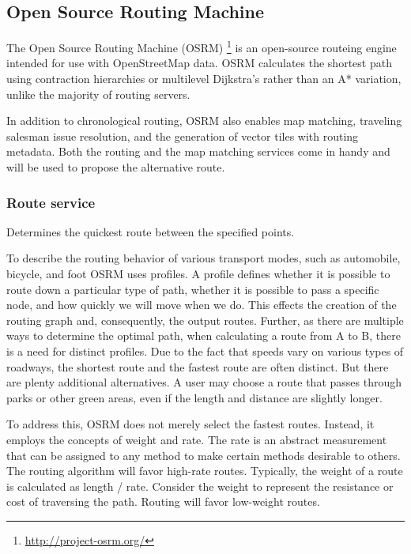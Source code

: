  




\subsection{Open Source Routing Machine}

The Open Source Routing Machine (OSRM) \footnote{\url{http://project-osrm.org/}} is an open-source routeing engine intended for use with OpenStreetMap data. OSRM calculates the shortest path using contraction hierarchies or multilevel Dijkstra's rather than an A* variation, unlike the majority of routing servers. \autocite[]{Delling2012}

In addition to chronological routing, OSRM also enables map matching, traveling salesman issue resolution, and the generation of vector tiles with routing metadata. Both the routing and the map matching services come in handy and will be used to propose the alternative route. 

\subsubsection{Route service}

Determines the quickest route between the specified points. 

To describe the routing behavior of various transport modes, such as automobile, bicycle, and foot OSRM uses profiles. A profile defines whether it is possible to route down a particular type of path, whether it is possible to pass a specific node, and how quickly we will move when we do. This effects the creation of the routing graph and, consequently, the output routes. Further, as there are multiple ways to determine the optimal path, when calculating a route from A to B, there is a need for distinct profiles. Due to the fact that speeds vary on various types of roadways, the shortest route and the fastest route are often distinct. But there are plenty additional alternatives. A user may choose a route that passes through parks or other green areas, even if the length and distance are slightly longer. 

To address this, OSRM does not merely select the fastest routes. Instead, it employs the concepts of weight and rate. The rate is an abstract measurement that can be assigned to any method to make certain methods desirable to others. The routing algorithm will favor high-rate routes. Typically, the weight of a route is calculated as length / rate. Consider the weight to represent the resistance or cost of traversing the path. Routing will favor low-weight routes. 


